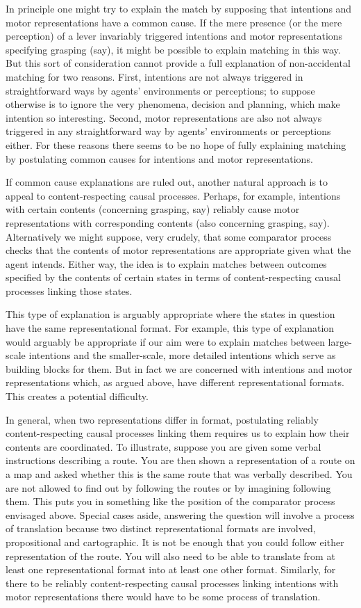 \documentclass[12pt,\papersize]{extarticle}
\begin{document}
In principle one might try to explain the match by supposing that intentions and motor representations have a common cause. If the mere presence (or the mere perception) of a lever invariably triggered intentions and motor representations specifying grasping (say), it might be possible to explain matching in this way. But this sort of consideration cannot provide a full explanation of non-accidental matching for two reasons. First, intentions are not always triggered in straightforward ways by agents' environments or perceptions; to suppose otherwise is to ignore the very phenomena, decision and planning, which make intention so interesting.  Second, motor representations are also not always triggered in any straightforward way by agents' environments or perceptions either.  For these reasons there seems to be no hope of fully explaining matching by postulating common causes for intentions and motor representations.

If common cause explanations are ruled out, another natural approach is to  appeal to content-respecting causal processes. Perhaps, for example, intentions with certain contents (concerning grasping, say) reliably cause motor representations with corresponding contents (also concerning grasping, say). Alternatively we might suppose, very crudely, that some comparator process checks that the contents of motor representations are appropriate given what the agent intends.  Either way, the idea is to explain matches between outcomes specified by the contents of certain states in terms of content-respecting causal processes linking those states. 

This type of explanation is arguably appropriate where the states in question have the same representational format.  For example, this type of explanation would arguably be appropriate if our aim were to explain matches between  large-scale intentions and the smaller-scale, more detailed intentions which serve as building blocks for them. But in fact we are concerned with intentions and motor representations which, as argued above, have different representational formats. This creates a potential difficulty.

In general, when two representations differ in format, postulating reliably content-respecting causal processes linking them requires us to explain how their contents are coordinated. To illustrate, suppose you are given some verbal instructions describing a route. You are then shown a representation of a route on a map and asked whether this is the same route that was verbally described. You are not allowed to find out by following the routes or by imagining following them. This puts you in something like the position of the comparator process envisaged above. Special cases aside, answering the question will involve a process of translation because two distinct representational formats are involved, propositional and cartographic. It is not be enough that you could follow either representation of the route. You will also need to be able to translate from at least one representational format into at least one other format. Similarly, for there to be reliably content-respecting causal processes linking intentions with motor representations there would have to be some process of translation.
\end{document}
